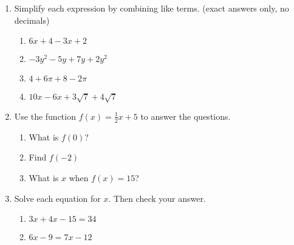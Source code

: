 \documentclass[12pt, twoside]{article}
\begin{document}
\begin{enumerate}[itemsep=0.5cm]
\newpage
\item Simplify each expression by combining like terms. (exact answers only, no decimals)
  \begin{multicols}{2}
      \begin{enumerate}[itemsep=1.5cm]
        \item $6x+4-3x+2$
        \item $-3y^2-5y+7y+2y^2$
        \item $4+6\pi+8-2\pi$
        \item $10x-6x+3\sqrt{7}+4\sqrt{7}$
      \end{enumerate}
  \end{multicols} \vspace{1cm}

\item Use the function $f(x) = \frac{1}{2}x+5$ to answer the questions.
  \begin{multicols}{2}
  \begin{enumerate}[itemsep=2cm]
      \item What is $f(0)$?
      \item Find $f(-2)$
      \item What is $x$ when $f(x) = 15$?
  \end{enumerate}
  \end{multicols} \vspace{2cm}

\item Solve each equation for $x$. Then check your answer.
  \begin{multicols}{2}
    \begin{enumerate}[itemsep=1cm]
  \item $3x + 4x - 15 = 34$
  \item $6x - 9 = 7x - 12$
  \end{enumerate}
  \end{multicols}


\end{enumerate}
\end{document}

